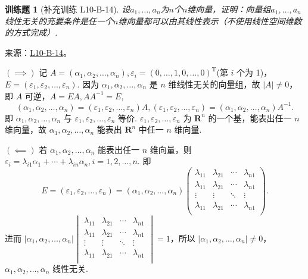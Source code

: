 \documentclass[UTF8,12pt,a4paper,fontset=fandol]{ctexart}
\newtheorem{exercise}{训练题}[section]
\begin{document}
\begin{exercise}[补充训练 L10-B-14]\label{prob:L10-B-14}
设$a_1,\ldots,a_n$为$n$个$n$维向量，证明：向量组$a_1,\ldots,a_n$线性无关的充要条件是任一个$n$维向量都可以由其线性表示（不使用线性空间维数的方式完成）.
\end{exercise}
\noindent 来源：\href{https://github.com/yhwu-is/Linear-Algebra-Left-Undone/blob/new/%E8%AE%B2%E4%B9%89/%E4%B8%93%E9%A2%98/10%20%E8%A1%8C%E5%88%97%E5%BC%8F.tex}{L10-B-14}。
\begin{solve}
$(\implies)$ 记 $A = (\alpha_1, \alpha_2, \ldots, \alpha_n), \varepsilon_i = (0, \ldots, 1, 0, \ldots, 0)^{\mathrm{T}}$(第 $i$ 个为 1)，$E = (\varepsilon_1, \varepsilon_2, \ldots, \varepsilon_n)$. 因为 $\alpha_1, \alpha_2, \ldots, \alpha_n$ 是 $n$ 维线性无关的向量组，故 $\lvert A \rvert \neq 0$，即 $A$ 可逆，$A = EA, AA^{-1} = E$,\[(\alpha_1, \alpha_2, \ldots, \alpha_n) = (\varepsilon_1, \varepsilon_2, \ldots, \varepsilon_n)A, (\varepsilon_1, \varepsilon_2, \ldots, \varepsilon_n) = (\alpha_1, \alpha_2, \ldots, \alpha_n)A^{-1}.\] 即 $\alpha_1, \alpha_2, \ldots, \alpha_n$ 与 $\varepsilon_1, \varepsilon_2, \ldots, \varepsilon_n$ 等价. $\varepsilon_1, \varepsilon_2, \ldots, \varepsilon_n$ 为 $\mathbf{R}^n$ 的一个基，能表出任一 $n$ 维向量，故 $\alpha_1, \alpha_2, \ldots, \alpha_n$ 能表出 $\mathbf{R}^n$ 中任一 $n$ 维向量.

            $(\impliedby)$ 若 $\alpha_1, \alpha_2, \ldots, \alpha_n$ 能表出任一 $n$ 维向量，则 $\varepsilon_i = \lambda_{i1}\alpha_1+\cdots+\lambda_{in}\alpha_n, i = 1, 2, \ldots, n$. 即
            \[E = (\varepsilon_1, \varepsilon_2, \ldots, \varepsilon_n) = (\alpha_1, \alpha_2, \ldots, \alpha_n)\begin{pmatrix}
                    \lambda_{11} & \lambda_{21} & \cdots & \lambda_{n1} \\
                    \lambda_{11} & \lambda_{21} & \cdots & \lambda_{n1} \\
                    \vdots       & \vdots       & \ddots & \vdots       \\
                    \lambda_{11} & \lambda_{21} & \cdots & \lambda_{n1} \\
                \end{pmatrix}.\]
            进而 $\lvert \alpha_1, \alpha_2, \ldots, \alpha_n \rvert \begin{vmatrix}
                    \lambda_{11} & \lambda_{21} & \cdots & \lambda_{n1} \\
                    \lambda_{11} & \lambda_{21} & \cdots & \lambda_{n1} \\
                    \vdots       & \vdots       & \ddots & \vdots       \\
                    \lambda_{11} & \lambda_{21} & \cdots & \lambda_{n1} \\
                \end{vmatrix} = 1$，所以 $\lvert \alpha_1, \alpha_2, \ldots, \alpha_n \rvert \neq 0$，$\alpha_1, \alpha_2, \ldots, \alpha_n$ 线性无关.
\end{solve}
\end{document}
